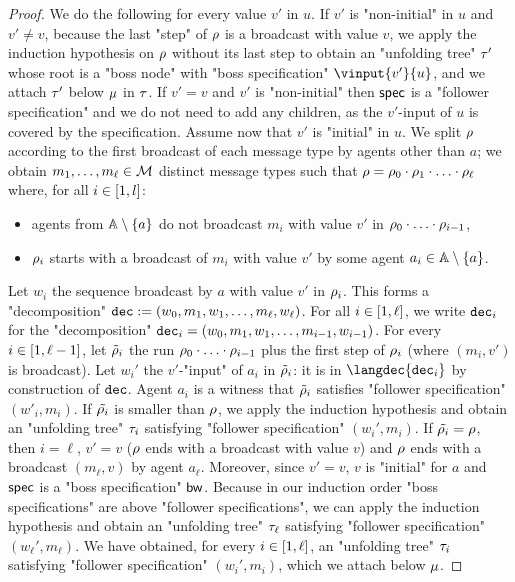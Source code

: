 \begin{proof}
	We do the following for every value $v'$ in $u$.
	If $v'$ is "non-initial" in $u$ and $v' \neq v$,
	because the last "step" of $\rho$ is a broadcast with value $v$, 
	we apply the induction hypothesis on $\rho$ without its last step to obtain an "unfolding tree" $\tau'$ whose root is a "boss node" with "boss specification" $\vinput{v'}{u}$, and we attach $\tau'$ below $\mu$ in $\tau$. 
	If $v'=v$ and $v'$ is "non-initial" then $\mathsf{spec}$ is a "follower specification" and we do not need to add any children, as the $v'$-input of $u$ is covered by the specification. 
	Assume now that $v'$ is "initial" in $u$. We split $\rho$ according to the first broadcast of each message type by agents other than $a$; we obtain $m_1, \dots, m_\ell \in \mathcal{M}$ distinct message types such that $\rho = \rho_0 \cdot \rho_1 \cdot \ldots \cdot \rho_\ell$ where, for all $i \in [1,l]$:
	\begin{itemize}
	\item agents from $\mathbb{A} \setminus \{a\}$ do not broadcast $m_i$ with value $v'$ in $\rho_0 \cdot \ldots \cdot \rho_{i-1}$,
	\item $\rho_i$ starts with a broadcast of $m_i$ with value $v'$ by some agent $a_i \in \mathbb{A} \setminus \{a\}$.
	\end{itemize} 
	
	Let $w_i$ the sequence broadcast by $a$ with value $v'$ in $\rho_i$. This forms a "decomposition" $\mathtt{dec} := (w_0, m_1, w_1, \ldots, m_\ell, w_\ell)$.
	For all $i \in [1,\ell]$, we write $\mathtt{dec}_i$ for the "decomposition" $\mathtt{dec}_i = (w_0, m_1, w_1, \ldots, m_{i-1}, w_{i-1})$. 
	For every $i \in [1,\ell-1]$, let $\tilde{\rho}_i$ the run $\rho_0 \cdot \ldots \cdot \rho_{i-1}$ plus the first step of $\rho_i$ (where $(m_i,v')$ is broadcast).
	Let $w_i'$ the $v'$-"input" of $a_i$ in $\tilde{\rho}_i$: it is in $\langdec{\decsymb_i}$ by construction of $\mathtt{dec}$. Agent $a_i$ is a witness that $\tilde{\rho}_i$ satisfies "follower specification" $(w'_i, m_i)$. 
	If $\tilde{\rho_i}$ is smaller than $\rho$, we apply the induction hypothesis and obtain an "unfolding tree" $\tau_i$ satisfying "follower specification" $(w_i', m_i)$. If $\tilde{\rho_i} = \rho$, then $i = \ell$, $v'=v$ ($\rho$ ends with a broadcast with value $v$) and $\rho$ ends with a broadcast $(m_\ell,v)$ by agent $a_\ell$. Moreover, since $v'=v$, $v$ is "initial" for $a$ and $\mathsf{spec}$ is a "boss specification" $\mathsf{bw}$. Because in our induction order "boss specifications" are above "follower specifications", we can apply the induction hypothesis and obtain an "unfolding tree" $\tau_\ell$ satisfying "follower specification" $(w_\ell', m_\ell)$. We have obtained, for every $i \in [1,\ell]$, an "unfolding tree" $\tau_i$ satisfying "follower specification" $(w_i', m_i)$, which we attach below $\mu$. 
	

\end{proof}
